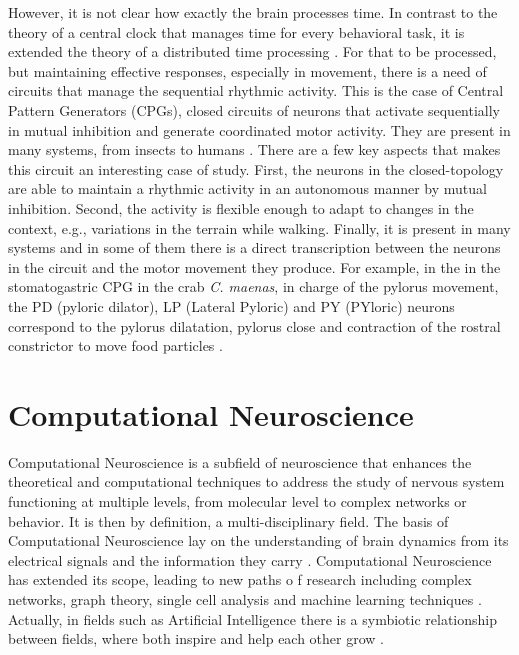 However, it is not clear how exactly the brain processes time. In contrast to the theory of a central clock that manages time for every behavioral task, it is extended the theory of a distributed time processing \parencite{buonomano_temporal_1995,ivry_representation_1996}. For that to be processed, but maintaining effective responses, especially in movement, there is a need of circuits that manage the sequential rhythmic activity. This is the case of Central Pattern Generators (CPGs), closed circuits of neurons that activate sequentially in mutual inhibition and generate coordinated motor activity. They are present in many systems, from insects to humans \parencite{pearson_central_1972,marder_central_2001,mackay-lyons_central_2002,minassian_human_2017}. There are a few key aspects that makes this circuit an interesting case of study. First, the neurons in the closed-topology are able to maintain a rhythmic activity in an autonomous manner by mutual inhibition. Second, the activity is flexible enough to adapt to changes in the context, e.g., variations in the terrain while walking. Finally, it is present in many systems and in some of them there is a direct transcription between the neurons in the circuit and the motor movement they produce. For example, in the in the stomatogastric CPG in the crab \textit{C. maenas}, in charge of the pylorus movement, the PD (pyloric dilator), LP (Lateral Pyloric) and PY (PYloric) neurons correspond to the pylorus dilatation, pylorus close and contraction of the rostral constrictor to move food particles \parencite{selverston_oscillations_2006}. 


\section{Computational Neuroscience}
Computational Neuroscience is a subfield of neuroscience that enhances the theoretical and computational techniques to address the study of nervous system functioning at multiple levels, from molecular level to complex networks or behavior. It is then by definition, a multi-disciplinary field. The basis of Computational Neuroscience lay on the understanding of brain dynamics from its electrical signals and the information they carry \parencite{schwiening_brief_2012,catterall_hodgkin-huxley_2012,dimitrov_information_2011,shannon_mathematical_1948}. Computational Neuroscience has extended its scope, leading to new paths o	f research including complex networks, graph theory, single cell analysis and machine learning techniques \parencite{cns2023}. Actually, in fields such as Artificial Intelligence there is a symbiotic relationship between fields, where both inspire and help each other grow \parencite{amunts_human_2019,wozniak_deep_2020,goncalves_training_2020}.

